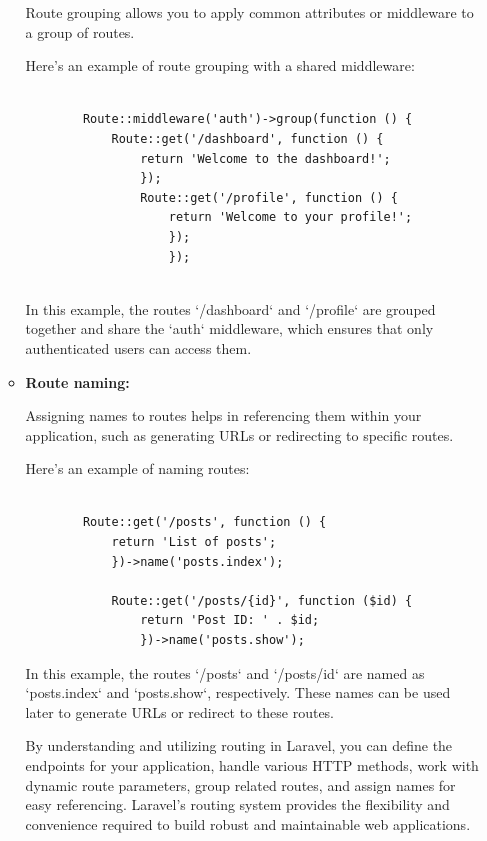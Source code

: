 \begin{enumerate}
\begin{itemize}
    Route grouping allows you to apply common attributes or middleware to a group of routes.
    
    \medskip Here's an example of route grouping with a shared middleware:
\begin{verbatim}
    
        Route::middleware('auth')->group(function () {
            Route::get('/dashboard', function () {
                return 'Welcome to the dashboard!';
                });
                Route::get('/profile', function () {
                    return 'Welcome to your profile!';
                    });
                    });
                    
    \end{verbatim}
   In this example, the routes `/dashboard` and `/profile` are grouped together and share the `auth` middleware, which ensures that only authenticated users can access them.

    \item \textbf{Route naming:}
   
    Assigning names to routes helps in referencing them within your application, such as generating URLs or redirecting to specific routes.
    
    \medskip Here's an example of naming routes:
    \begin{verbatim}
        
        Route::get('/posts', function () {
            return 'List of posts';
            })->name('posts.index');
            
            Route::get('/posts/{id}', function ($id) {
                return 'Post ID: ' . $id;
                })->name('posts.show');
            \end{verbatim}
                
            In this example, the routes `/posts` and `/posts/{id}` are named as `posts.index` and `posts.show`, respectively. These names can be used later to generate URLs or redirect to these routes.
            
            By understanding and utilizing routing in Laravel, you can define the endpoints for your application, handle various HTTP methods, work with dynamic route parameters, group related routes, and assign names for easy referencing. Laravel's routing system provides the flexibility and convenience required to build robust and maintainable web applications.
        \end{itemize}
 \end{enumerate}
